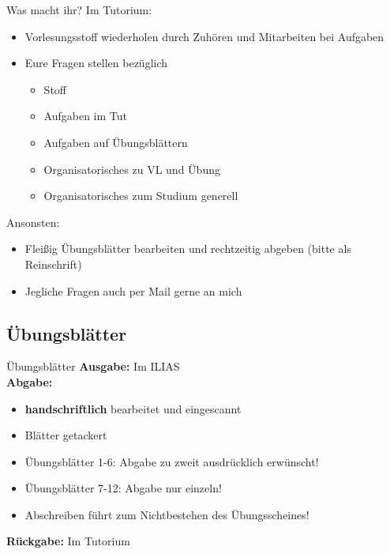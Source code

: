 {		\begin{frame}{Was macht ihr?}
			Im Tutorium:
			\begin{itemize}
				\item Vorlesungsstoff wiederholen durch Zuhören und Mitarbeiten bei Aufgaben
				\item Eure Fragen stellen bezüglich \begin{itemize}
					\item Stoff
					\item Aufgaben im Tut
					\item Aufgaben auf Übungsblättern
					\item Organisatorisches zu VL und Übung
					\item Organisatorisches zum Studium generell
				\end{itemize}
			\end{itemize}
			\pause
			\medskip
			Ansonsten:
			\begin{itemize}
				\item Fleißig Übungsblätter bearbeiten und rechtzeitig abgeben (bitte als Reinschrift)
				\item Jegliche Fragen auch per Mail gerne an mich
			\end{itemize}

		\end{frame}
	}
	
\subsection{Übungsblätter}
	\begin{frame}{Übungsblätter}
		\textbf{Ausgabe:} Im ILIAS \\
		\pause
		\textbf{Abgabe:}
			\begin{itemize}
				\item \textbf{handschriftlich} bearbeitet und eingescannt
				\item Blätter getackert
				\item Übungsblätter 1-6: Abgabe zu zweit ausdrücklich erwünscht!
				\item Übungsblätter 7-12: Abgabe nur einzeln!
				\item Abschreiben führt zum Nichtbestehen des Übungsscheines!
			\end{itemize}
		\pause	
		\textbf{Rückgabe:} Im Tutorium
	\end{frame}

